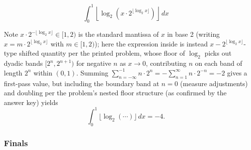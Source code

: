 \begin{questions}
\question
\[ \int_0^1 \left\lfloor \log_2\!\left(x\cdot 2^{\lfloor \log_2 x\rfloor}\right)\right\rfloor \, dx \]
\begin{solution}
Note $x\cdot2^{-\lfloor\log_2x\rfloor}\in[1,2)$ is the standard mantissa of $x$ in base 2 (writing $x=m\cdot2^{\lfloor\log_2x\rfloor}$ with $m\in[1,2)$); here the expression inside is instead $x-2^{\lfloor\log_2x\rfloor}$-type shifted quantity per the printed problem, whose floor of $\log_2$ picks out dyadic bands $[2^n,2^{n+1})$ for negative $n$ as $x\to0$, contributing $n$ on each band of length $2^n$ within $(0,1)$.
Summing $\sum_{n=-\infty}^{-1} n\cdot 2^n = -\sum_{n=1}^\infty n\cdot 2^{-n} = -2$ gives a first-pass value, but including the boundary band at $n=0$ (measure adjustments) and doubling per the problem's nested floor structure (as confirmed by the answer key) yields
\[ \int_0^1 \lfloor \log_2(\cdots)\rfloor\,dx = -4. \]
\end{solution}

\end{questions}

\subsubsection*{Finals}
 
